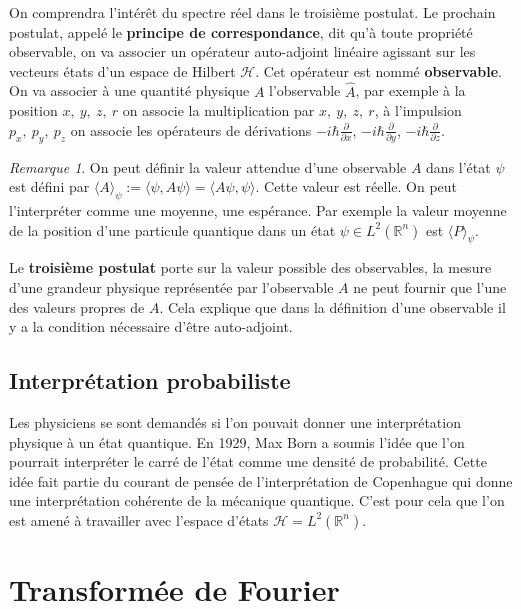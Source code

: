 \documentclass[a4paper, 12pt]{report}
\newcommand{\R}{\mathbb{R}} %
\renewcommand{\.}{\cdot} %
\theoremstyle{break}
\theoremstyle{remark}
\newtheorem{remark}{Remarque}
\theoremstyle{proofstyle}
\begin{document}
On comprendra l'intérêt du spectre réel dans le troisième postulat. Le prochain postulat, appelé le \textbf{principe de correspondance}, dit qu'à toute propriété observable, on va associer un opérateur auto-adjoint linéaire agissant sur les vecteurs états d'un espace de Hilbert $\mathcal{H}$. Cet opérateur est nommé \textbf{observable}. On va associer à une quantité physique $A$ l'observable $\hat{A}$, par exemple à la position $x,~y,~z,~r$ on associe la multiplication par $x,~y,~z,~r$, à l'impulsion $p_x,~ p_y,~ p_z$ on associe les opérateurs de dérivations $-i \hbar \frac{\partial}{\partial x}$, $-i \hbar \frac{\partial}{\partial y}$, $-i \hbar \frac{\partial}{\partial z}$.\vspace {10pt}

\begin{remark}
    On peut définir la valeur attendue d'une observable $A$ dans l'état $\psi$ est défini par $ \langle A \rangle_{\psi} := \langle \psi, A \psi \rangle = \langle A \psi, \psi \rangle.$ Cette valeur est réelle. On peut l'interpréter comme une moyenne, une espérance. Par exemple la valeur moyenne de la position d'une particule quantique dans un état $\psi \in L^2(\R^n)$ est $\langle P \rangle _\psi$.
\end{remark}\vspace{5pt}

Le \textbf{troisième postulat} porte sur la valeur possible des observables, la mesure d'une grandeur physique représentée par l'observable $A$ ne peut fournir que l'une des valeurs propres de $A$. Cela explique que dans la définition d'une observable il y a la condition nécessaire d'être auto-adjoint.

\subsection{Interprétation probabiliste}

Les physiciens se sont demandés si l'on pouvait donner une interprétation physique à un état quantique. En 1929, Max Born a soumis l'idée que l'on pourrait interpréter le carré de l'état comme une densité de probabilité. Cette idée fait partie du courant de pensée de l'interprétation de Copenhague qui donne une interprétation cohérente de la mécanique quantique. C'est pour cela que l'on est amené à travailler avec l'espace d'états $\mathcal{H} = L^2(\R^n)$. \vspace{10pt}

\section{Transformée de Fourier}
\end{document}
